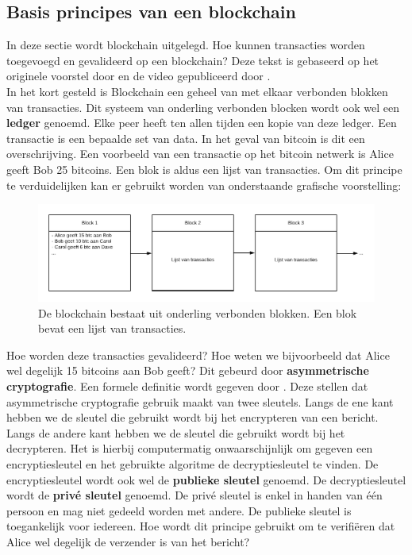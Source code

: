\subsection{Basis principes van een blockchain}
In deze sectie wordt blockchain uitgelegd. Hoe kunnen transacties worden toegevoegd en gevalideerd op een blockchain? Deze tekst is gebaseerd op het originele voorstel door \textcite{Satoshi2009} en de video gepubliceerd door \textcite{Blue2017}.\\

In het kort gesteld is Blockchain een geheel van met elkaar verbonden blokken van transacties. Dit systeem van onderling verbonden blocken wordt ook wel een \textbf{ledger} genoemd. Elke peer heeft ten allen tijden een kopie van deze ledger. Een transactie is een bepaalde set van data. In het geval van bitcoin is dit een overschrijving. Een voorbeeld van een transactie op het bitcoin netwerk is Alice geeft Bob 25 bitcoins. Een blok is aldus een lijst van transacties. Om dit principe te verduidelijken kan er gebruikt worden van onderstaande grafische voorstelling:\\

\begin{figure}[h!]
	\centering
		\includegraphics[scale=0.4]{blockchain-1.png}
	\caption[Blockchain - Voorstelling 1]{De blockchain bestaat uit onderling verbonden blokken. Een blok bevat een lijst van transacties.}
\end{figure}

Hoe worden deze transacties gevalideerd? Hoe weten we bijvoorbeeld dat Alice wel degelijk 15 bitcoins aan Bob geeft? Dit gebeurd door \textbf{asymmetrische cryptografie}. Een formele definitie wordt gegeven door \textcite{Farah2012}. Deze stellen dat asymmetrische cryptografie gebruik maakt van twee sleutels. Langs de ene kant hebben we de sleutel die gebruikt wordt bij het encrypteren van een bericht. Langs de andere kant hebben we de sleutel die gebruikt wordt bij het decrypteren. Het is hierbij computermatig onwaarschijnlijk om gegeven een encryptiesleutel en het gebruikte algoritme de decryptiesleutel te vinden. De encryptiesleutel wordt ook wel de \textbf{publieke sleutel} genoemd. De decryptiesleutel wordt de \textbf{privé sleutel} genoemd. De privé sleutel is enkel in handen van één persoon en mag niet gedeeld worden met andere. De publieke sleutel is toegankelijk voor iedereen. Hoe wordt dit principe gebruikt om te verifiëren dat Alice wel degelijk de verzender is van het bericht?\\

